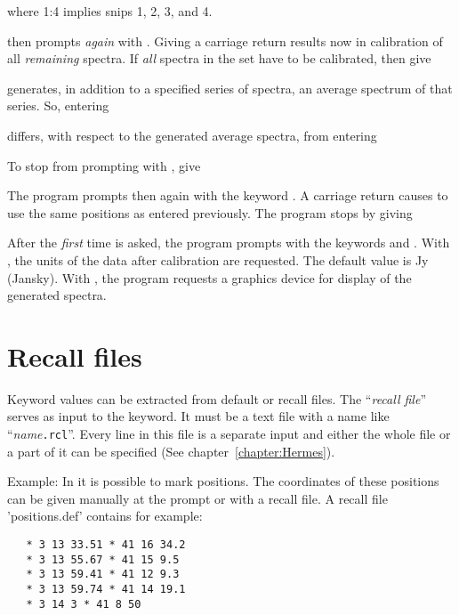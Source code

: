 
where 1:4 implies snips 1, 2, 3, and 4. 

 then prompts {\em again} with .  Giving
a carriage return results now in calibration of all {\em remaining}
spectra.  If {\em all} spectra in the set have to be calibrated, then
give


 generates, in addition to a specified series of
spectra, an average spectrum of that series.  So, entering


differs, with respect to the generated average spectra, from entering


To stop  from prompting with , give


The program prompts then again with the keyword .  A
carriage return causes  to use the same positions as
entered previously.  The program stops by giving


After the {\em first} time  is asked, the program prompts
with the keywords  and .  With
, the units of the data after calibration are requested. 
The default value is Jy (Jansky).  With , the program
requests a graphics device for display of the generated spectra. 
 

\label{chapter:Advanced}

\section{Recall files}

Keyword values can be extracted from default or recall files.
The ``{\em recall file\/}'' serves as input to the keyword.
It must be a text file with a name like ``{\it name\/}{\tt .rcl}''.
Every line in this file is a separate input and either the whole file 
or a part of it can be specified (See chapter~\ref{chapter:Hermes}).

Example: In  it is possible to mark positions. The
coordinates of these positions can be given manually at the 
 prompt or with a recall  file.
A recall file 'positions.def' contains for example:
\begin{verbatim}
   * 3 13 33.51 * 41 16 34.2
   * 3 13 55.67 * 41 15 9.5
   * 3 13 59.41 * 41 12 9.3
   * 3 13 59.74 * 41 14 19.1
   * 3 14 3 * 41 8 50
\end{verbatim}

